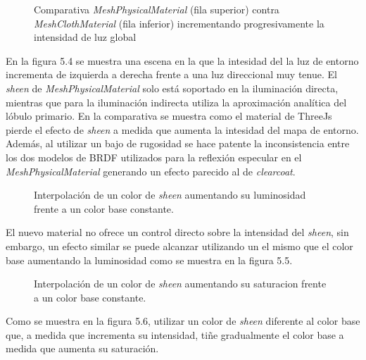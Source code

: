 \begin{figure}[H]
  \vspace{0.5cm}
  \centering
  \caption{Comparativa \textit{MeshPhysicalMaterial} (fila superior) contra \textit{MeshClothMaterial} (fila inferior) incrementando
  progresivamente la intensidad de luz global}
\end{figure}

En la figura 5.4 se muestra una escena en la que la intesidad del la luz de entorno incrementa de izquierda a derecha
frente a una luz direccional muy tenue. El \textit{sheen} de \textit{MeshPhysicalMaterial} solo est\'a soportado en la
iluminaci\'on directa, mientras que para la iluminaci\'on indirecta utiliza la aproximaci\'on anal\'itica del l\'obulo primario.
En la comparativa se muestra como el material de ThreeJs pierde el efecto de \textit{sheen} a medida que aumenta la intesidad
del mapa de entorno. Adem\'as, al utilizar un bajo de rugosidad se hace patente la inconsistencia entre los dos modelos de BRDF
utilizados para la reflexi\'on especular en el \textit{MeshPhysicalMaterial} generando un efecto parecido al de \textit{clearcoat}.



\begin{figure}[H]
  \vspace{0.5cm}
  \centering
  \caption{Interpolaci\'on de un color de \textit{sheen} aumentando su luminosidad frente a un color base constante.}
\end{figure}

El nuevo material no ofrece un control directo sobre la intensidad del \textit{sheen}, sin embargo, un efecto similar se puede
alcanzar utilizando un el mismo que el color base aumentando la luminosidad como se muestra en la figura 5.5.

\begin{figure}[H]
  \vspace{0.5cm}
  \centering
  \caption{Interpolaci\'on de un color de \textit{sheen} aumentando su saturacion frente a un color base constante.}
\end{figure}
\singlespacing

Como se muestra en la figura 5.6, utilizar un color de \textit{sheen} diferente al color base que, a medida que incrementa su intensidad,
ti\~ne gradualmente el color base a medida que aumenta su saturaci\'on.

